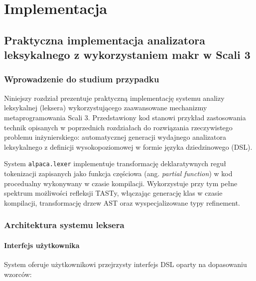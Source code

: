 \chapter{Implementacja}
\label{ch:implementacja}


\section{Praktyczna implementacja analizatora leksykalnego z wykorzystaniem makr w Scali 3}\label{sec:praktyczna-implementacja-analizatora-leksykalnego-z-wykorzystaniem-makr-w-scali-3}

\subsection{Wprowadzenie do studium przypadku}\label{subsec:wprowadzenie-do-studium-przypadku}

Niniejszy rozdział prezentuje praktyczną implementację systemu analizy leksykalnej (leksera) wykorzystującego zaawansowane mechanizmy metaprogramowania Scali 3.
Przedstawiony kod stanowi przykład zastosowania technik opisanych w poprzednich rozdziałach do rozwiązania rzeczywistego problemu inżynierskiego: automatycznej generacji wydajnego analizatora leksykalnego z definicji wysokopoziomowej w formie języka dziedzinowego (DSL).

System \texttt{alpaca.lexer} implementuje transformację deklaratywnych reguł tokenizacji zapisanych jako funkcja częściowa (ang. \textit{partial function}) w kod procedualny wykonywany w czasie kompilacji.
Wykorzystuje przy tym pełne spektrum możliwości refleksji TASTy, włączając generację klas w czasie kompilacji, transformację drzew AST oraz wyspecjalizowane typy refinement.

\subsection{Architektura systemu leksera}\label{subsec:architektura-systemu-leksera}

\subsubsection{Interfejs użytkownika}\label{subsubsec:interfejs-uzytkownika}

System oferuje użytkownikowi przejrzysty interfejs DSL oparty na dopasowaniu wzorców:



